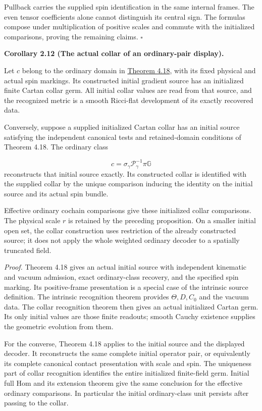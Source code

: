\documentclass[
  english,
  11pt,
  reqno]{amsart}
\makeatletter
\newcommand{\pandocstatementheading}[1]{%
  \par\addpenalty{\@beginparpenalty}%
  \addvspace{.5\baselineskip plus .2\baselineskip minus .2\baselineskip}%
  {\normalfont\bfseries #1\par}%
  \nobreak\@afterindenttrue\@afterheading
}
\makeatother
\begin{document}
Pullback carries the supplied spin identification in the same internal
frames. The even tensor coefficients alone cannot distinguish its
central sign. The formulas compose under multiplication of positive
scales and commute with the initialized comparisons, proving the
remaining claims. \hfill\(\square\)

\pandocstatementheading{\leavevmode{}\label{cor:online-ordinary-pair-cartan-collar}Corollary 2.12 (The actual collar of an ordinary-pair display).}

Let \(c\) belong to the ordinary domain in
\hyperref[thm:online-ordinary-negative-response-initial-source]{Theorem
4.18}, with its fixed physical and actual spin markings. Its constructed
initial gradient source has an initialized finite Cartan collar germ.
All initial collar values are read from that source, and the recognized
metric is a smooth Ricci-flat development of its exactly recovered data.

Conversely, suppose a supplied initialized Cartan collar has an initial
source satisfying the independent canonical tests and retained-domain
conditions of Theorem 4.18. The ordinary class

\label{eq:online-cartan-canonical-ordinary-decoder} \[
c=\sigma_\gamma\mathscr P_\gamma^{-1}\pi\mathbb G
\] reconstructs that initial source exactly. Its constructed collar is
identified with the supplied collar by the unique comparison inducing
the identity on the initial source and its actual spin bundle.

Effective ordinary cochain comparisons give these initialized collar
comparisons. The physical scale \(r\) is retained by the preceding
proposition. On a smaller initial open set, the collar construction uses
restriction of the already constructed source; it does not apply the
whole weighted ordinary decoder to a spatially truncated field.

\emph{Proof.} Theorem 4.18 gives an actual initial source with
independent kinematic and vacuum admission, exact ordinary-class
recovery, and the specified spin marking. Its positive-frame
presentation is a special case of the intrinsic source definition. The
intrinsic recognition theorem provides \(\Theta,D,C_0\) and the vacuum
data. The collar recognition theorem then gives an actual initialized
Cartan germ. Its only initial values are those finite readouts; smooth
Cauchy existence supplies the geometric evolution from them.

For the converse, Theorem 4.18 applies to the initial source and the
displayed decoder. It reconstructs the same complete initial operator
pair, or equivalently its complete canonical contact presentation with
scale and spin. The uniqueness part of collar recognition identifies the
entire initialized finite-field germ. Initial full Hom and its extension
theorem give the same conclusion for the effective ordinary comparisons.
In particular the initial ordinary-class unit persists after passing to
the collar.
\end{document}
